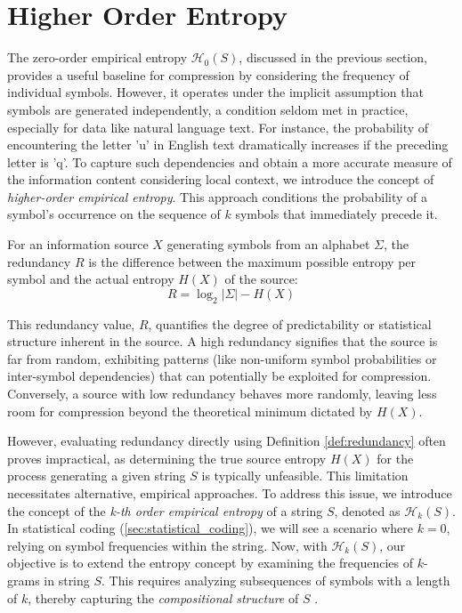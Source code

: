 \section{Higher Order Entropy} \label{sec:higher_order_entropy}

\noindent The zero-order empirical entropy $\mathcal{H}_0(S)$, discussed in the previous section, provides a useful baseline for compression by considering the frequency of individual symbols. However, it operates under the implicit assumption that symbols are generated independently, a condition seldom met in practice, especially for data like natural language text. For instance, the probability of encountering the letter 'u' in English text dramatically increases if the preceding letter is 'q'. To capture such dependencies and obtain a more accurate measure of the information content considering local context, we introduce the concept of \emph{higher-order empirical entropy}. This approach conditions the probability of a symbol's occurrence on the sequence of $k$ symbols that immediately precede it.

\begin{definition}[Redundancy] \label{def:redundancy}
    For an information source $X$ generating symbols from an alphabet $\Sigma$, the redundancy $R$ is the difference between the maximum possible entropy per symbol and the actual entropy $H(X)$ of the source:
    \begin{equation}
        R = \log_2 |\Sigma| - H(X)
    \end{equation}
\end{definition}

\noindent This redundancy value, $R$, quantifies the degree of predictability or statistical structure inherent in the source. A high redundancy signifies that the source is far from random, exhibiting patterns (like non-uniform symbol probabilities or inter-symbol dependencies) that can potentially be exploited for compression. Conversely, a source with low redundancy behaves more randomly, leaving less room for compression beyond the theoretical minimum dictated by $H(X)$.

\noindent However, evaluating redundancy directly using Definition \ref{def:redundancy} often proves impractical, as determining the true source entropy $H(X)$ for the process generating a given string $S$ is typically unfeasible. This limitation necessitates alternative, empirical approaches. To address this issue, we introduce the concept of the \emph{k-th order empirical entropy} of a string $S$, denoted as $\mathcal{H}_k(S)$. In statistical coding (\autoref{sec:statistical_coding}), we will see a scenario where $k=0$, relying on symbol frequencies within the string. Now, with $\mathcal{H}_k(S)$, our objective is to extend the entropy concept by examining the frequencies of $k$-grams in string $S$. This requires analyzing subsequences of symbols with a length of $k$, thereby capturing the \emph{compositional structure} of $S$ \cite{ferragina2023pearls}.

